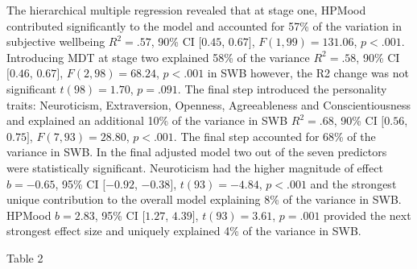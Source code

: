 \documentclass[man,floatsintext]{apa6}
\theoremstyle{definition}
\theoremstyle{definition}
\theoremstyle{definition}
\theoremstyle{remark}
\begin{document}
The hierarchical multiple regression revealed that at stage one, HPMood
contributed significantly to the model and accounted for 57\% of the
variation in subjective wellbeing \(R^2 = .57\), 90\% CI \([0.45\),
\(0.67]\), \(F(1, 99) = 131.06\), \(p < .001\). Introducing MDT at stage
two explained 58\% of the variance \(R^2 = .58\), 90\% CI \([0.46\),
\(0.67]\), \(F(2, 98) = 68.24\), \(p < .001\) in SWB however, the R2
change was not significant \(t(98) = 1.70\), \(p = .091\). The final
step introduced the personality traits: Neuroticism, Extraversion,
Openness, Agreeableness and Conscientiousness and explained an
additional 10\% of the variance in SWB \(R^2 = .68\), 90\% CI \([0.56\),
\(0.75]\), \(F(7, 93) = 28.80\), \(p < .001\). The final step accounted
for 68\% of the variance in SWB. In the final adjusted model two out of
the seven predictors were statistically significant. Neuroticism had the
higher magnitude of effect \(b = -0.65\), 95\% CI \([-0.92\),
\(-0.38]\), \(t(93) = -4.84\), \(p < .001\) and the strongest unique
contribution to the overall model explaining 8\% of the variance in SWB.
HPMood \(b = 2.83\), 95\% CI \([1.27\), \(4.39]\), \(t(93) = 3.61\),
\(p = .001\) provided the next strongest effect size and uniquely
explained 4\% of the variance in SWB.

Table 2
\end{document}
